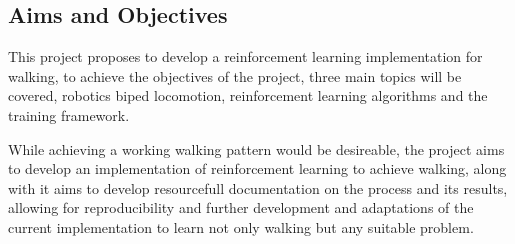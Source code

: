         \subsection{Aims and Objectives}
        This project proposes to develop a reinforcement learning implementation for walking, 
        to achieve the objectives of the project, three main topics will be covered, 
        robotics biped locomotion, reinforcement learning algorithms and the training framework.

        While achieving a working walking pattern would be desireable, the project aims to develop an implementation of reinforcement learning to achieve walking, 
        along with it aims to develop resourcefull documentation on the process and its results, allowing for reproducibility and further development and 
        adaptations of the current implementation to learn not only walking but any suitable problem.